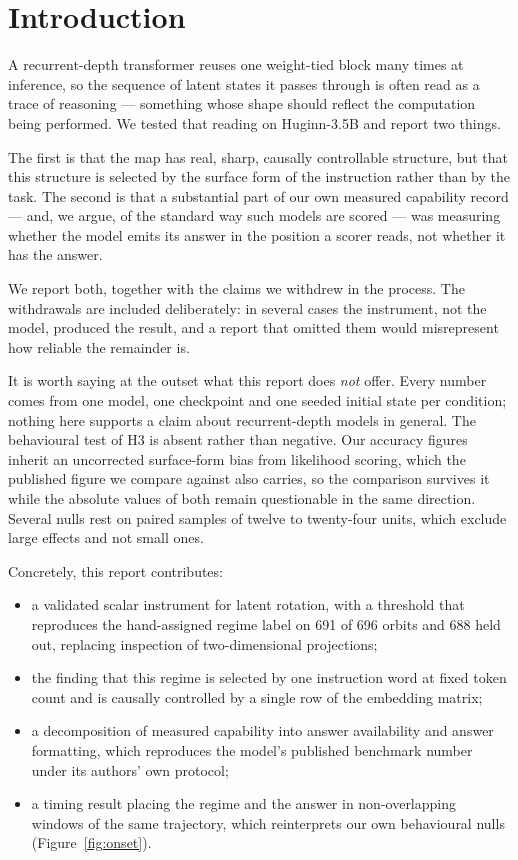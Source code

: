 \documentclass{zapiski}
\begin{document}
\section{Introduction}

A recurrent-depth transformer reuses one weight-tied block many times at inference, so the
sequence of latent states it passes through is often read as a trace of reasoning --- something
whose shape should reflect the computation being performed. We tested that reading on
Huginn-3.5B \cite{geiping2025huginn} and report two things.

The first is that the map has real, sharp, causally controllable structure, but that this
structure is selected by the surface form of the instruction rather than by the task. The second
is that a substantial part of our own measured capability record --- and, we argue, of the
standard way such models are scored --- was measuring whether the model emits its answer in the
position a scorer reads, not whether it has the answer.

We report both, together with the claims we withdrew in the process. The withdrawals are
included deliberately: in several cases the instrument, not the model, produced the result, and
a report that omitted them would misrepresent how reliable the remainder is.

It is worth saying at the outset what this report does \emph{not} offer. Every number comes from
one model, one checkpoint and one seeded initial state per condition; nothing here supports a claim
about recurrent-depth models in general. The behavioural test of H3 is absent rather than negative.
Our accuracy figures inherit an uncorrected surface-form bias from likelihood scoring, which the
published figure we compare against also carries, so the comparison survives it while the absolute
values of both remain questionable in the same direction. Several nulls rest on paired samples of
twelve to twenty-four units, which exclude large effects and not small ones.

Concretely, this report contributes:
\begin{itemize}\itemsep2pt \parskip0pt
\item a validated scalar instrument for latent rotation, with a threshold that reproduces the
      hand-assigned regime label on 691 of 696 orbits and 688 held out, replacing inspection of
      two-dimensional projections;
\item the finding that this regime is selected by one instruction word at fixed token count and
      is causally controlled by a single row of the embedding matrix;
\item a decomposition of measured capability into answer availability and answer formatting,
      which reproduces the model's published benchmark number under its authors' own protocol;
\item a timing result placing the regime and the answer in non-overlapping windows of the same
      trajectory, which reinterprets our own behavioural nulls (Figure~\ref{fig:onset}).
\end{itemize}
\end{document}

